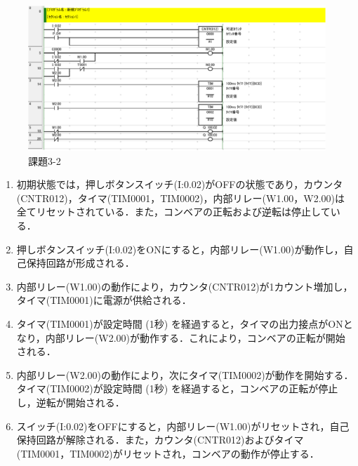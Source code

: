 \begin{figure}[H]
  \centering
  \includegraphics[scale=1]{sozai/3-2-crop.pdf}
  \caption{課題3-2}
\end{figure}

\begin{enumerate}
  \item 初期状態では，押しボタンスイッチ(I:0.02)がOFFの状態であり，カウンタ(CNTR012)，タイマ(TIM0001，TIM0002)，内部リレー(W1.00，W2.00)は全てリセットされている．また，コンベアの正転および逆転は停止している．
  \item 押しボタンスイッチ(I:0.02)をONにすると，内部リレー(W1.00)が動作し，自己保持回路が形成される．
  \item 内部リレー(W1.00)の動作により，カウンタ(CNTR012)が1カウント増加し，タイマ(TIM0001)に電源が供給される．
  \item タイマ(TIM0001)が設定時間 (1秒) を経過すると，タイマの出力接点がONとなり，内部リレー(W2.00)が動作する．これにより，コンベアの正転が開始される．
  \item 内部リレー(W2.00)の動作により，次にタイマ(TIM0002)が動作を開始する．タイマ(TIM0002)が設定時間 (1秒) を経過すると，コンベアの正転が停止し，逆転が開始される．
  \item スイッチ(I:0.02)をOFFにすると，内部リレー(W1.00)がリセットされ，自己保持回路が解除される．また，カウンタ(CNTR012)およびタイマ(TIM0001，TIM0002)がリセットされ，コンベアの動作が停止する．
\end{enumerate}



